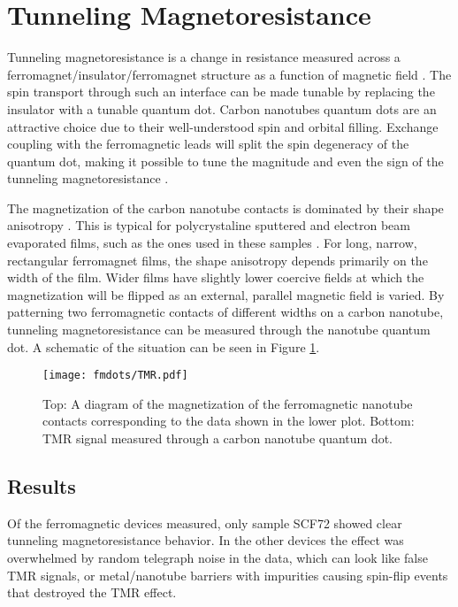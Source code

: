\section{Tunneling Magnetoresistance}
\label{sec:TMR}

Tunneling magnetoresistance is a change in resistance measured across a ferromagnet/insulator/ferromagnet structure as a function of magnetic field \cite{Julliere1975}. The spin transport through such an interface can be made tunable by replacing the insulator with a tunable quantum dot. Carbon nanotubes quantum dots are an attractive choice due to their well-understood spin and orbital filling. Exchange coupling with the ferromagnetic leads will split the spin degeneracy of the quantum dot, making it possible to tune the magnitude and even the sign of the tunneling magnetoresistance \cite{Tsymbal2003, Sahoo2005, Thamankar2006}.

The magnetization of the carbon nanotube contacts is dominated by their shape anisotropy \cite{Morrish1983}. This is typical for polycrystaline sputtered and electron beam evaporated films, such as the ones used in these samples \cite{Johnson1999}. For long, narrow, rectangular ferromagnet films, the shape anisotropy depends primarily on the width of the film. Wider films have slightly lower coercive fields at which the magnetization will be flipped as an external, parallel magnetic field is varied. By patterning two ferromagnetic contacts of different widths on a carbon nanotube, tunneling magnetoresistance can be measured through the nanotube quantum dot. A schematic of the situation can be seen in Figure \ref{fig:spin_valve}.

\begin{figure}
    \centering
    \texttt{[image: fmdots/TMR.pdf]}
    \caption{Top: A diagram of the magnetization of the ferromagnetic nanotube contacts corresponding to the data shown in the lower plot. Bottom: TMR signal measured through a carbon nanotube quantum dot.}
    \label{fig:spin_valve}
\end{figure}

\subsection{Results}

Of the ferromagnetic devices measured, only sample SCF72 showed clear tunneling magnetoresistance behavior. In the other devices the effect was overwhelmed by random telegraph noise in the data, which can look like false TMR signals, or metal/nanotube barriers with impurities causing spin-flip events that destroyed the TMR effect.

